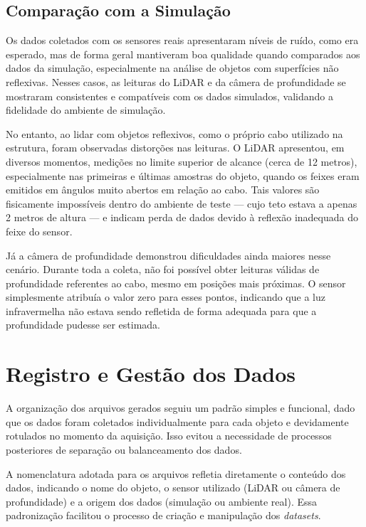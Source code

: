 \subsection{Comparação com a Simulação}

Os dados coletados com os sensores reais apresentaram níveis de ruído, como era esperado, mas de forma geral mantiveram boa qualidade quando comparados aos dados da simulação, especialmente na análise de objetos com superfícies não reflexivas. Nesses casos, as leituras do LiDAR e da câmera de profundidade se mostraram consistentes e compatíveis com os dados simulados, validando a fidelidade do ambiente de simulação.

No entanto, ao lidar com objetos reflexivos, como o próprio cabo utilizado na estrutura, foram observadas distorções nas leituras. O LiDAR apresentou, em diversos momentos, medições no limite superior de alcance (cerca de 12 metros), especialmente nas primeiras e últimas amostras do objeto, quando os feixes eram emitidos em ângulos muito abertos em relação ao cabo. Tais valores são fisicamente impossíveis dentro do ambiente de teste — cujo teto estava a apenas 2 metros de altura — e indicam perda de dados devido à reflexão inadequada do feixe do sensor.

Já a câmera de profundidade demonstrou dificuldades ainda maiores nesse cenário. Durante toda a coleta, não foi possível obter leituras válidas de profundidade referentes ao cabo, mesmo em posições mais próximas. O sensor simplesmente atribuía o valor zero para esses pontos, indicando que a luz infravermelha não estava sendo refletida de forma adequada para que a profundidade pudesse ser estimada.

\section{Registro e Gestão dos Dados}

A organização dos arquivos gerados seguiu um padrão simples e funcional, dado que os dados foram coletados individualmente para cada objeto e devidamente rotulados no momento da aquisição. Isso evitou a necessidade de processos posteriores de separação ou balanceamento dos dados.

A nomenclatura adotada para os arquivos refletia diretamente o conteúdo dos dados, indicando o nome do objeto, o sensor utilizado (LiDAR ou câmera de profundidade) e a origem dos dados (simulação ou ambiente real). Essa padronização facilitou o processo de criação e manipulação dos \textit{datasets}.

